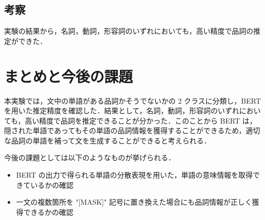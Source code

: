 \documentclass[twocolumn]{jarticle}
\begin{document}
%
%





 \subsection{考察}
 実験の結果から，名詞，動詞，形容詞のいずれにおいても，高い精度で品詞の推定ができた．

\section{まとめと今後の課題}
本実験では，文中の単語がある品詞かそうでないかの 2 クラスに分類し，BERT を用いた推定精度を確認した．結果として，名詞，動詞，形容詞のいずれにおいても，高い精度で品詞を推定できることが分かった．このことから BERT は，隠された単語であってもその単語の品詞情報を獲得することができるため，適切な品詞の単語を補って文を生成することができると考えられる．\par
今後の課題としては以下のようなものが挙げられる．
\begin{itemize}
  \item BERT の出力で得られる単語の分散表現を用いた，単語の意味情報を取得できているかの確認
  \item 一文の複数箇所を "[MASK]" 記号に置き換えた場合にも品詞情報が正しく獲得できるかの確認
\end{itemize}







\end{document}
